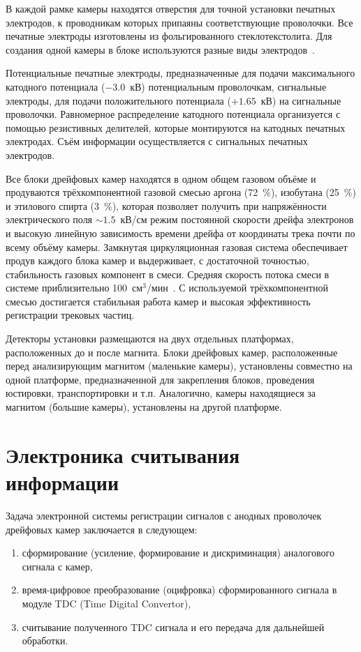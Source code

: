 В каждой рамке камеры находятся отверстия для точной установки печатных
электродов, к проводникам которых припаяны соответствующие проволочки. Все
печатные электроды изготовлены из фольгированного стеклотекстолита. Для создания
одной камеры в блоке используются разные виды электродов~\cite{vodopianov75}.

Потенциальные печатные электроды, предназначенные для подачи максимального
катодного потенциала ($-3.0$~кВ) потенциальным проволочкам, сигнальные
электроды, для подачи положительного потенциала ($+1.65$~кВ) на сигнальные
проволочки. Равномерное распределение катодного потенциала организуется с
помощью резистивных делителей, которые монтируются на катодных печатных
электродах. Съём информации осуществляется с сигнальных печатных электродов.

Все блоки дрейфовых камер находятся в одном общем газовом объёме и продуваются
трёхкомпонентной газовой смесью аргона (72~$\%$), изобутана (25~$\%$) и
этилового спирта (3~$\%$), которая позволяет получить при напряжённости
электрического поля $\sim 1.5$~кВ/см режим постоянной скорости дрейфа
электронов и высокую линейную зависимость времени дрейфа от координаты трека
почти по всему объёму камеры. Замкнутая циркуляционная газовая система
обеспечивает продув каждого блока камер и выдерживает, с достаточной точностью,
стабильность газовых компонент в смеси. Средняя скорость потока смеси в системе
приблизительно 100~см$^{3}$/мин~\cite{filatova77}. С используемой
трёхкомпонентной смесью достигается стабильная работа камер и высокая
эффективность регистрации трековых частиц.

Детекторы установки размещаются на двух отдельных платформах, расположенных до и
после магнита. Блоки дрейфовых камер, расположенные перед анализирующим магнитом
(маленькие камеры), установлены совместно на одной платформе, предназначенной
для закрепления блоков, проведения юстировки, транспортировки и т.п.
Аналогично, камеры находящиеся за магнитом (большие камеры), установлены на
другой платформе.

\section{Электроника считывания информации}
\label{section:electro}
Задача электронной системы регистрации сигналов с анодных проволочек дрейфовых
камер заключается в следующем:

\begin{enumerate}
\item сформирование (усиление, формирование и дискриминация) аналогового сигнала
  с камер,
\item время-цифровое \! преобразование (оцифровка) \! сформированного сигнала в
  модуле TDC (Time Digital Convertor),
\item считывание полученного TDC сигнала и его передача для дальнейшей
  обработки.
\end{enumerate}

